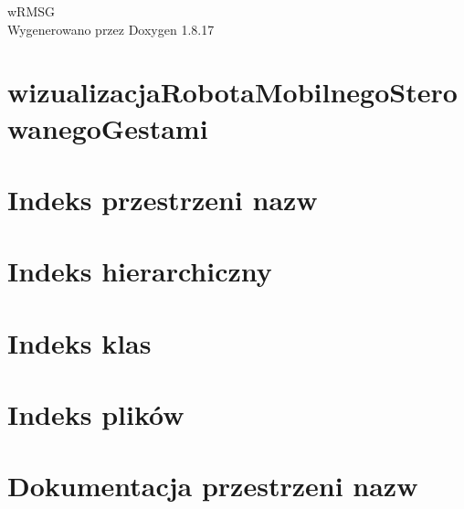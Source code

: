 \let\mypdfximage\pdfximage\def\pdfximage{\immediate\mypdfximage}\documentclass[twoside]{book}
\newcommand{\+}{\discretionary{\mbox{\scriptsize$\hookleftarrow$}}{}{}}
\newcommand{\clearemptydoublepage}{%
  \newpage{\pagestyle{empty}\cleardoublepage}%
}
\begin{document}
\hypersetup{pageanchor=false,
             bookmarksnumbered=true,
             pdfencoding=unicode
            }
\begin{titlepage}
\vspace*{7cm}
\begin{center}%
{\Large w\+R\+M\+SG }\\
\vspace*{1cm}
{\large Wygenerowano przez Doxygen 1.8.17}\\
\end{center}
\end{titlepage}
\clearemptydoublepage
{}
\tableofcontents
\clearemptydoublepage
{}
\hypersetup{pageanchor=true}

\chapter{wizualizacja\+Robota\+Mobilnego\+Sterowanego\+Gestami}
\label{md__media_sf__d__d_r_i_v_e__studia_6semestr_wds_wizualizacja_robota_mobilnego_sterowanego_gestami_prj__r_e_a_d_m_e}

\chapter{Indeks przestrzeni nazw}

\chapter{Indeks hierarchiczny}

\chapter{Indeks klas}

\chapter{Indeks plików}

\chapter{Dokumentacja przestrzeni nazw}


\end{document}

